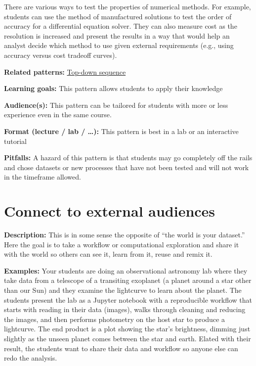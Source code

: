 \documentclass[]{book}
\begin{document}
There are various ways to test the properties of numerical methods. For
example, students can use the method of manufactured solutions to test the
order of accuracy for a differential equation solver. They can also measure
cost as the resolution is increased and present the results in a way that would
help an analyst decide which method to use given external requirements (e.g.,
using accuracy versus cost tradeoff curves).

\textbf{Related patterns:}
\protect\hyperlink{top-down-sequence}{Top-down sequence}

\textbf{Learning goals:}
This pattern allows students to apply their knowledge

\textbf{Audience(s):}
This pattern can be tailored for students with more or less experience even in
the same course.

\textbf{Format (lecture / lab / \ldots):}
This pattern is best in a lab or an interactive tutorial

\textbf{Pitfalls:}
A hazard of this pattern is that students may go completely off the rails and
chose datasets or new processes that have not been tested and will not work in
the timeframe allowed.

\hypertarget{connect-to-external-audiences}{%
\section{Connect to external audiences}\label{connect-to-external-audiences}}

\textbf{Description:}
This is in some sense the opposite of ``the world is your dataset.''
Here the goal is to take a workflow or computational exploration and share it with
the world so others can see it, learn from it, reuse and remix it.

\textbf{Examples:}
Your students are doing an observational astronomy lab where they take data from a
telescope of a transiting exoplanet (a planet around a star other than our Sun)
and they examine the lightcurve to learn about the planet. The students present the
lab as a Jupyter notebook with a reproducible workflow that starts with reading in
their data (images), walks through cleaning and reducing the images, and then
performs photometry on the host star to produce a lightcurve. The end product is a
plot showing the star's brightness, dimming just slightly as the unseen planet comes
between the star and earth. Elated with their result, the students want to share
their data and workflow so anyone else can redo the analysis.
\end{document}

